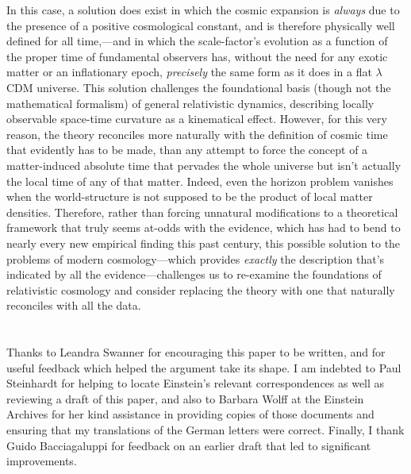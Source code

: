 \documentclass[12 pt]{article}
\begin{document}
In this case, a solution does exist \citep{Janzen2012a,Janzen2012b} in which the cosmic expansion is \textit{always} due to the presence of a positive cosmological constant, and is therefore physically well defined for all time,---and in which the scale-factor's evolution as a function of the proper time of fundamental observers has, without the need for any exotic matter or an inflationary epoch, \textit{precisely} the same form as it does in a flat $\lambda$CDM universe. This solution challenges the foundational basis (though not the mathematical formalism) of general relativistic dynamics, describing locally observable space-time curvature as a kinematical effect. However, for this very reason, the theory reconciles more naturally with the definition of cosmic time that evidently has to be made, than any attempt to force the concept of a matter-induced absolute time that pervades the whole universe but isn't actually the local time of any of that matter. Indeed, even the horizon problem vanishes when the world-structure is not supposed to be the product of local matter densities. Therefore, rather than forcing unnatural modifications to a theoretical framework that truly seems at-odds with the evidence, which has had to bend to nearly every new empirical finding this past century, this possible solution to the problems of modern cosmology---which provides \textit{exactly} the description that's indicated by all the evidence---challenges us to re-examine the foundations of relativistic cosmology and consider replacing the theory with one that naturally reconciles with all the data.\vspace{-24pt}

\section*{}
{\small Thanks to Leandra Swanner for encouraging this paper to be written, and for useful feedback which helped the argument take its shape. I am indebted to Paul Steinhardt for helping to locate Einstein's relevant correspondences as well as reviewing a draft of this paper, and also to Barbara Wolff at the Einstein Archives for her kind assistance in providing copies of those documents and ensuring that my translations of the German letters were correct. Finally, I thank Guido Bacciagaluppi for feedback on an earlier draft that led to significant improvements.}
\end{document}
